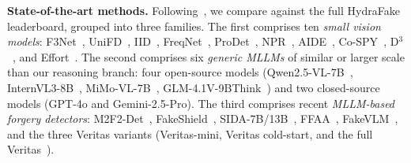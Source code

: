 \documentclass[10pt,twocolumn,letterpaper]{article}
\begin{document}
\textbf{State-of-the-art methods.}
Following~\cite{veritas}, we compare against the full HydraFake leaderboard, grouped into three families. The first comprises ten \emph{small vision models}: F3Net~\cite{f3net}, UniFD~\cite{univfd}, IID~\cite{iid}, FreqNet~\cite{freqblender}, ProDet~\cite{prodet}, NPR~\cite{npr}, AIDE~\cite{aide}, Co-SPY~\cite{cospy}, D$^3$~\cite{d3}, and Effort~\cite{effort}. The second comprises six \emph{generic MLLMs} of similar or larger scale than our reasoning branch: four open-source models (Qwen2.5-VL-7B~\cite{qwenvl}, InternVL3-8B~\cite{internvl3}, MiMo-VL-7B~\cite{mimo}, GLM-4.1V-9BThink~\cite{glm4v}) and two closed-source models (GPT-4o and Gemini-2.5-Pro). The third comprises recent \emph{MLLM-based forgery detectors}: M2F2-Det~\cite{m2f2det}, FakeShield~\cite{fakeshield}, SIDA-7B/13B~\cite{sida}, FFAA~\cite{ffaa}, FakeVLM~\cite{fakevlm}, and the three Veritas variants (Veritas-mini, Veritas cold-start, and the full Veritas~\cite{veritas}).
\end{document}
